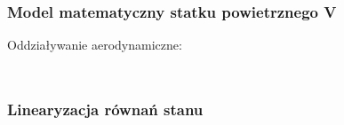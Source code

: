 \documentclass[aspectratio=169]{beamer}
\begin{document}
\begin{frame}%
	\frametitle{Model matematyczny statku powietrznego V}
	Oddziaływanie aerodynamiczne:
	\begin{columns}
		\begin{column}{0.4\textwidth}
	   	 	\begin{figure}
	   		 \centering

	    		\end{figure}
		\end{column}
		\begin{column}{0.6\textwidth}
	   	 	\begin{figure}
	   		 \centering
	    		\end{figure}
		\end{column}
	\end{columns}
\end{frame}

\begin{frame}%
	\frametitle{Linearyzacja równań stanu}
	\begin{columns}
		\begin{column}{0.5\textwidth}
				\uncover<2->{\[
						\bm{u} = \begin{bmatrix}\omega_1 \quad \omega_2 \quad ... \quad \omega_n\end{bmatrix}^T
					\]
					\[
						\bm{C} = \bm{I} \hspace{10pt} \bm{D} = \bm{0}
					\]}
				\uncover<3->{\[
				\begin{cases}
					\dot{\bm{x}} \left(t\right)  = \bm{f} \left(t,\bm{x}\left(t\right),\bm{u}\left(t\right) \right) \\
					\bm{y} \left(t\right) = \bm{g} \left(t,\bm{x}\left(t\right),\bm{u}\left(t\right) \right)
				\end{cases}
				\]}	
		\end{column}
		\begin{column}{0.5\textwidth}
	   	 	\uncover<4->{\[
				\begin{cases}
					\dot{\bm{x}} \left(t\right)  = \bm{Ax} \left(t\right)  + \bm{Bu} \left(t\right) \\
					\bm{y} \left(t\right) = \bm{Cx} \left(t\right) + \bm{Du} \left(t\right)
				\end{cases}
				\]}
		\end{column}
	\end{columns}
\end{frame}
\end{document}
